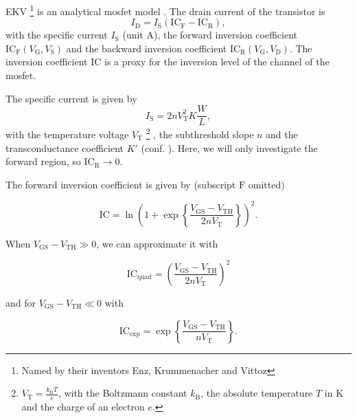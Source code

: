 \documentclass{article}[11pt]
\begin{document}
\notetitle

EKV%
\footnote{Named by their inventors Enz, Krummenacher and Vittoz}
is an analytical \gls{mosfet} model \cite{enz-ekv-90}.
The drain current of the transistor is
\begin{equation}
I_{\mathrm{D}} = I_{\mathrm{S}} \left(\mathrm{IC}_{\mathrm{F}}-\mathrm{IC}_{\mathrm{R}}\right),
\end{equation}
with the specific current $I_{\mathrm{S}}$ (unit A), the forward 
inversion coefficient 
$\mathrm{IC}_{\mathrm{F}}(V_{\mathrm{G}}, V_{\mathrm{S}})$ and 
the backward inversion coefficient 
$\mathrm{IC}_{\mathrm{R}}(V_{\mathrm{G}}, V_{\mathrm{D}})$.
The inversion coefficient $\mathrm{IC}$ is a proxy for the inversion level of 
the channel of the \gls{mosfet}.

\medskip

The specific current is given by
\begin{equation}
  I_{\mathrm{S}} = 2 n V_{\mathrm{T}}^2 K \frac{W}{L},
\end{equation}
with the temperature voltage $V_{\mathrm{T}}$%
\footnote{$V_{\mathrm{T}}=\frac{k_{\mathrm{B}} T }{e}$, with the 
Boltzmann constant $k_{\mathrm{B}}$, the absolute temperature $T$
in \si{\kelvin} and the charge of an electron $e$.}
,
the subthreshold slope $n$ and the transconductance coefficient $K'$ 
(conf. \cite{mosfet-square-law}).
Here, we will only investigate the forward region, so 
$\mathrm{IC}_{\mathrm{R}} \rightarrow 0$.

\medskip

The forward inversion coefficient is given by 
(subscript $\mathrm{F}$ omitted)

\begin{equation}\label{eq:ic}
  \mathrm{IC} = \ln\left(1+\exp\left\{\frac{V_{\mathrm{GS}}-V_{\mathrm{TH}}}{2 n V_{\mathrm{T}}}\right\}\right)^2.
\end{equation}


When $V_{\mathrm{GS}}-V_{\mathrm{TH}} \gg 0$, we can approximate 
it with

\begin{equation}\label{eq:ic-quad}
  \mathrm{IC}_{\mathrm{quad}} = \left(\frac{V_{\mathrm{GS}}-V_{\mathrm{TH}}}{2 n V_{\mathrm{T}}}\right)^2
\end{equation}

and for $V_{\mathrm{GS}}-V_{\mathrm{TH}} \ll 0$ with

\begin{equation}\label{eq:ic-exp}
  \mathrm{IC}_{\mathrm{exp}} = \exp\left\{\frac{V_{\mathrm{GS}}-V_{\mathrm{TH}}}{n V_{\mathrm{T}}}\right\}.
\end{equation}
\end{document}
